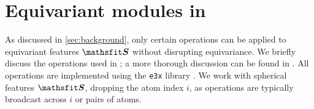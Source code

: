 \documentclass[10pt]{article} %
\newcommand{\ML}[1]{#1}
\begin{document}





\newpage
\appendix
{}


\section{Equivariant modules in \lorem}
\label{sec:apx-modules}

As discussed in \cref{sec:background}, only certain operations can be applied to equivariant features $\tS$ without disrupting equivariance. We briefly discuss the operations used in \lorem; a more thorough discussion can be found in \citet{s2021,um2024}. All operations are implemented using the \texttt{e3x} library \citep{um2024}.
We work with spherical features $\tS$, dropping the atom index $i$, as operations are typically broadcast across $i$ or pairs of atoms.
\end{document}
